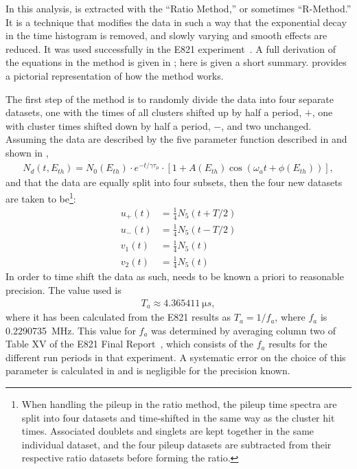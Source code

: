
In this analysis, \wa is extracted with the ``Ratio Method,'' or sometimes ``R-Method.'' It is a technique that modifies the data in such a way that the exponential decay in the time histogram is removed, and slowly varying and smooth effects are reduced. It was used successfully in the E821 experiment~\cite{JKThesis,LDThesis,JPThesis}. A full derivation of the equations in the method is given in ; here is given a short summary.  provides a pictorial representation of how the method works.

The first step of the method is to randomly divide the data into four separate datasets, one with the times of all clusters shifted up by half a \gmtwo period, $+$\Tatwo, one with cluster times shifted down by half a \gmtwo period, $-$\Tatwo, and two unchanged. Assuming the data are described by the five parameter function described in  and shown in , %
        \begin{align} \label{eq:5parfuncrepeated}
            N_{d}(t, E_{th}) = N_{0}(E_{th}) \cdot e^{-t/\gamma\tau_{\mu}} \cdot [1 + A(E_{th}) \cos(\omega_{a}t+\phi(E_{th}))],
        \end{align}
and that the data are equally split into four subsets, then the four new datasets are taken to be\footnote{When handling the pileup in the ratio method, the pileup time spectra are split into four datasets and time-shifted in the same way as the cluster hit times. Associated doublets and singlets are kept together in the same individual dataset, and the four pileup datasets are subtracted from their respective ratio datasets before forming the ratio.}:
    \begin{equation}
    \begin{aligned}
        u_{+}(t) &= \frac{1}{4} N_{5}(t+T/2) \\
        u_{-}(t) &= \frac{1}{4} N_{5}(t-T/2) \\
        v_{1}(t) &= \frac{1}{4} N_{5}(t) \\
        v_{2}(t) &= \frac{1}{4} N_{5}(t)
    \end{aligned}
    \end{equation}
In order to time shift the data as such, \Ta needs to be known a priori to reasonable precision. The value used is
        \begin{align}
            T_{a} \approx \SI{4.365411}{\micro s},
        \label{eq:Ta}
        \end{align}
where it has been calculated from the E821 results as $T_{a} = 1/f_{a}$, where $f_{a}$ is \SI{0.2290735}{MHz}. This value for $f_{a}$ was determined by averaging column two of Table XV of the E821 Final Report~\cite{E821FinalReport}, which consists of the $f_{a}$ results for the different run periods in that experiment. A systematic error on the choice of this parameter is calculated in  and is negligible for the precision known.


